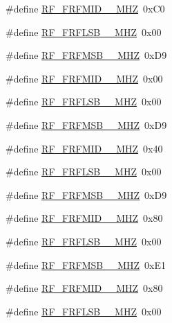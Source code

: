 \begin{DoxyCompactItemize}
\item 
\#define \mbox{\hyperlink{sx1276_regs-_fsk_8h_ab234cf9eacbcdd90a4533c2021003a3d}{R\+F\+\_\+\+F\+R\+F\+M\+I\+D\+\_\+\_\+\+M\+HZ}}~0x\+C0
\item 
\#define \mbox{\hyperlink{sx1276_regs-_fsk_8h_a3dd2b64da47687e9f790392f01273113}{R\+F\+\_\+\+F\+R\+F\+L\+S\+B\+\_\+\_\+\+M\+HZ}}~0x00
\item 
\#define \mbox{\hyperlink{sx1276_regs-_fsk_8h_a3d68b88442a5c8b7f80d9c615088220b}{R\+F\+\_\+\+F\+R\+F\+M\+S\+B\+\_\+\_\+\+M\+HZ}}~0x\+D9
\item 
\#define \mbox{\hyperlink{sx1276_regs-_fsk_8h_a2ba15a463e655bf6b331e41d1162abbc}{R\+F\+\_\+\+F\+R\+F\+M\+I\+D\+\_\+\_\+\+M\+HZ}}~0x00
\item 
\#define \mbox{\hyperlink{sx1276_regs-_fsk_8h_a9a969086561d3e987798039b3b9cac58}{R\+F\+\_\+\+F\+R\+F\+L\+S\+B\+\_\+\_\+\+M\+HZ}}~0x00
\item 
\#define \mbox{\hyperlink{sx1276_regs-_fsk_8h_ab854d00a5751351eb073ba41bd066d27}{R\+F\+\_\+\+F\+R\+F\+M\+S\+B\+\_\+\_\+\+M\+HZ}}~0x\+D9
\item 
\#define \mbox{\hyperlink{sx1276_regs-_fsk_8h_a337c9786171b07f0fa5f58d53ae10758}{R\+F\+\_\+\+F\+R\+F\+M\+I\+D\+\_\+\_\+\+M\+HZ}}~0x40
\item 
\#define \mbox{\hyperlink{sx1276_regs-_fsk_8h_a6925adb66395bd8bb21743caba42c9f9}{R\+F\+\_\+\+F\+R\+F\+L\+S\+B\+\_\+\_\+\+M\+HZ}}~0x00
\item 
\#define \mbox{\hyperlink{sx1276_regs-_fsk_8h_a2ace97f7a21f64054c6e3269922426a1}{R\+F\+\_\+\+F\+R\+F\+M\+S\+B\+\_\+\_\+\+M\+HZ}}~0x\+D9
\item 
\#define \mbox{\hyperlink{sx1276_regs-_fsk_8h_adbc52c9dc5896fe162b01114caba6fc5}{R\+F\+\_\+\+F\+R\+F\+M\+I\+D\+\_\+\_\+\+M\+HZ}}~0x80
\item 
\#define \mbox{\hyperlink{sx1276_regs-_fsk_8h_a6c0278026a620c9acd18814372785f46}{R\+F\+\_\+\+F\+R\+F\+L\+S\+B\+\_\+\_\+\+M\+HZ}}~0x00
\item 
\#define \mbox{\hyperlink{sx1276_regs-_fsk_8h_aede2d8353a6f4503837b467d42177217}{R\+F\+\_\+\+F\+R\+F\+M\+S\+B\+\_\+\_\+\+M\+HZ}}~0x\+E1
\item 
\#define \mbox{\hyperlink{sx1276_regs-_fsk_8h_a7f8d47495d559a0d89bee64f0f219578}{R\+F\+\_\+\+F\+R\+F\+M\+I\+D\+\_\+\_\+\+M\+HZ}}~0x80
\item 
\#define \mbox{\hyperlink{sx1276_regs-_fsk_8h_ac420052c647dbb18db24e44bd556dc45}{R\+F\+\_\+\+F\+R\+F\+L\+S\+B\+\_\+\_\+\+M\+HZ}}~0x00

\end{DoxyCompactItemize}
